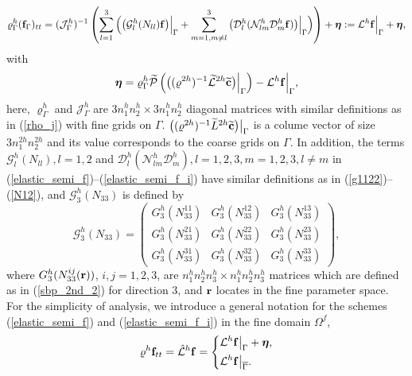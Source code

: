 \begin{equation}\label{elastic_semi_f_i}
{\varrho}^h_\Gamma ({\bf f}_\Gamma)_{tt} =
( {\mathcal{ J}}^{h}_\Gamma)^{-1}\left(\sum_{l=1}^3\Big(\big(\mathcal{G}_l^{h}({N}_{ll}){\bf f}\big)\Big|_\Gamma+\sum_{m=1,m\neq l}^3\big(\mathcal{D}_l^{h}(\mathcal{N}_{lm}^{h}\mathcal{D}_m^{h}{\bf f})\big)\Big|_\Gamma\Big) \right) + {\bm \eta} := \mathcal{L}^h{\bf f}\Big|_\Gamma + {\bm \eta},
\end{equation}
with 
\begin{equation}\label{eta}
{\bm \eta} = {\varrho}^h_{\Gamma}\wt{\mathcal{P}}\left(\big(({ \varrho}^{2h})^{-1}\wt{\mathcal{L}}^{2h} \wt{{\bf c}}\big)\Big|_{\Gamma}\right) - \mathcal{L}^{h}{\bf f}\Big|_{\Gamma},
\end{equation}
here, ${\varrho}^{h}_{\Gamma}$ and ${\mathcal{ J}}^{h}_{\Gamma}$ are $3n_1^hn_2^h\times 3n_1^hn_2^h$ diagonal matrices with similar definitions as in (\ref{rho_j}) with fine grids on $\Gamma$. $\big(({\varrho}^{2h})^{-1}\widetilde{L}^{2h} \widetilde{{\bf c}}\big)\big|_{\Gamma}$ is a colume vector of size $3n_1^{2h} n_2^{2h}$ and its value corresponds to the coarse grids on $\Gamma$. In addition, the terms $\mathcal{G}_l^h({N}_{ll}), l = 1,2$ and $\mathcal{D}_l^h(\mathcal{N}_{lm}^h\mathcal{D}_m^h), l=1,2,3,m=1,2,3,l\neq m$ in (\ref{elastic_semi_f})--(\ref{elastic_semi_f_i}) have similar definitions as in (\ref{g1122})--(\ref{N12}), and $\mathcal{G}_3^h({N}_{33})$ is defined by
\[ \mathcal{G}^{h}_3({N}_{33}) = \left(\begin{array}{ccc}
G_3^{h}(N_{33}^{11}) & G_3^{h}(N_{33}^{12})  & G_3^{h}(N_{33}^{13}) \\
G_3^{h}(N_{33}^{21}) & G_3^{h}(N_{33}^{22})  & G_3^{h}(N_{33}^{23}) \\
G_3^{h}(N_{33}^{31}) & G_3^{h}(N_{33}^{32})  & G_3^{h}(N_{33}^{33}) \end{array}\right),\]
where ${G}_3^{h}(N_{33}^{ij}({\bf r}))$, $i,j = 1,2,3$, are $n_1^{h}n_2^{h}n_3^{h}\times n_1^{h}n_2^{h}n_3^{h}$ matrices which are defined as in (\ref{sbp_2nd_2}) for direction $3$, and ${\bf r}$ locates in the fine parameter space. For the simplicity of analysis, we introduce a general notation for the schemes (\ref{elastic_semi_f}) and (\ref{elastic_semi_f_i}) in the fine domain $\Omega^f$,
\begin{align}\label{fine_scheme}
{\varrho}^h{\bf f}_{tt} = \hat{\mathcal{L}}^h{\bf f} = \left\{
\begin{aligned}
&\mathcal{L}^h{\bf f}\big|_\Gamma +{\bm \eta}, \\
&\mathcal{L}^h{\bf f}\big|_{\overline{\Gamma}}.
\end{aligned}
\right.
\end{align}
